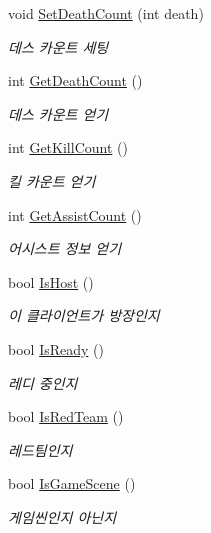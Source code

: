 \begin{DoxyCompactItemize}
void \hyperlink{class_room_client_af009e20b4d9f6209308ba65a99108132}{Set\+Death\+Count} (int death)
\begin{DoxyCompactList}\small\item\em 데스 카운트 세팅 \end{DoxyCompactList}\item 
int \hyperlink{class_room_client_a96701bcafe8b043c50c68b444fcc4ce5}{Get\+Death\+Count} ()
\begin{DoxyCompactList}\small\item\em 데스 카운트 얻기 \end{DoxyCompactList}\item 
int \hyperlink{class_room_client_aa83650c93a773c1e2bf80503d54137b4}{Get\+Kill\+Count} ()
\begin{DoxyCompactList}\small\item\em 킬 카운트 얻기 \end{DoxyCompactList}\item 
int \hyperlink{class_room_client_a95b4f7d48d426b554b1cb542450fb089}{Get\+Assist\+Count} ()
\begin{DoxyCompactList}\small\item\em 어시스트 정보 얻기 \end{DoxyCompactList}\item 
bool \hyperlink{class_room_client_a5e79fbf09ee0f8c5ed9500116fe04fb2}{Is\+Host} ()
\begin{DoxyCompactList}\small\item\em 이 클라이언트가 방장인지 \end{DoxyCompactList}\item 
bool \hyperlink{class_room_client_acd23b894bb8090e89d1bd7163c1db395}{Is\+Ready} ()
\begin{DoxyCompactList}\small\item\em 레디 중인지 \end{DoxyCompactList}\item 
bool \hyperlink{class_room_client_adc646ab59c5581d2f15b117d4eb51987}{Is\+Red\+Team} ()
\begin{DoxyCompactList}\small\item\em 레드팀인지 \end{DoxyCompactList}\item 
bool \hyperlink{class_room_client_ad906becf30abca17614ca70f00a3aa28}{Is\+Game\+Scene} ()
\begin{DoxyCompactList}\small\item\em 게임씬인지 아닌지 \end{DoxyCompactList}\item 

\end{DoxyCompactItemize}
